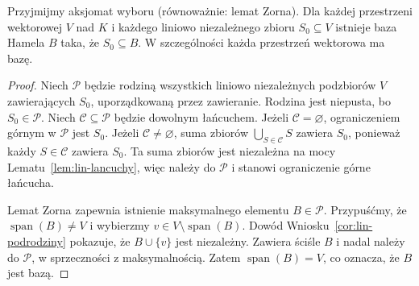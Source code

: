 \begin{twierdzenie}
\label{thm:lin-istnienie-bazy-zorn}
Przyjmijmy aksjomat wyboru (równoważnie: lemat Zorna).
Dla każdej przestrzeni wektorowej \(V\) nad \(K\)
i każdego liniowo niezależnego zbioru
\(S_0\subseteq V\) istnieje baza Hamela \(B\)
taka, że \(S_0\subseteq B\).
W szczególności każda przestrzeń wektorowa ma bazę.
\end{twierdzenie}
\begin{proof}
Niech \(\mathcal P\) będzie rodziną wszystkich
liniowo niezależnych podzbiorów \(V\)
zawierających \(S_0\), uporządkowaną
przez zawieranie. Rodzina jest niepusta,
bo \(S_0\in\mathcal P\).
Niech \(\mathcal C\subseteq\mathcal P\)
będzie dowolnym łańcuchem.
Jeżeli \(\mathcal C=\varnothing\),
ograniczeniem górnym w \(\mathcal P\)
jest \(S_0\).
Jeżeli \(\mathcal C\neq\varnothing\),
suma zbiorów \(\bigcup_{S\in\mathcal C}S\)
zawiera \(S_0\), ponieważ każdy
\(S\in\mathcal C\) zawiera \(S_0\).
Ta suma zbiorów jest niezależna na mocy
Lematu~\ref{lem:lin-lancuchy},
więc należy do \(\mathcal P\)
i stanowi ograniczenie górne łańcucha.

Lemat Zorna zapewnia istnienie maksymalnego
elementu \(B\in\mathcal P\).
Przypuśćmy, że \(\operatorname{span}(B)\neq V\)
i wybierzmy \(v\in V\setminus\operatorname{span}(B)\).
Dowód Wniosku~\ref{cor:lin-podrodziny}
pokazuje, że \(B\cup\{v\}\) jest niezależny.
Zawiera ściśle \(B\) i nadal należy do
\(\mathcal P\), w sprzeczności z maksymalnością.
Zatem \(\operatorname{span}(B)=V\),
co oznacza, że \(B\) jest bazą.
\end{proof}

